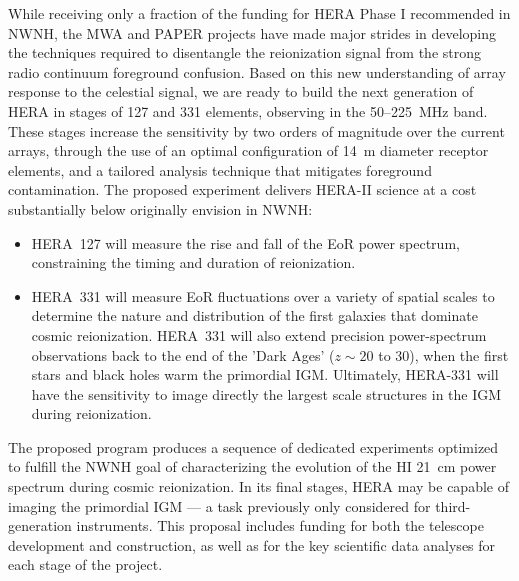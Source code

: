 \documentclass[preprint]{aastex}
\begin{document}
While receiving only a fraction of the funding for HERA Phase I
recommended in NWNH, the MWA and PAPER projects have made
major strides in developing the techniques required to disentangle
the reionization signal from the strong radio continuum foreground
confusion. Based on this new understanding of array response to the
celestial signal, we are ready to build the next generation of HERA in
stages of 127 and 331 elements, observing in the 50--225~MHz band.
These stages increase the sensitivity by two orders of
magnitude over the current arrays, through the use of an
optimal configuration of 14~m diameter receptor elements, and a
tailored analysis technique that mitigates foreground contamination.
The proposed experiment delivers HERA-II science at a cost
substantially below originally envision in NWNH:


\vspace{-4pt}
\begin{itemize}\setlength{\parskip}{0pt}\itemsep0pt

\item HERA~127 will measure the rise and fall of the EoR power
spectrum, constraining the timing and duration of reionization.

\item HERA~331 will measure EoR fluctuations over a variety of spatial
scales to determine the nature and distribution of the first galaxies
that dominate cosmic reionization. HERA~331 will also extend precision
power-spectrum observations back to the end of the 'Dark Ages' ($z \sim 20$
to 30), when the first stars and black holes warm the primordial IGM. Ultimately,
HERA-331 will have the sensitivity to
image directly the largest scale structures in the IGM during reionization.

\end{itemize}
\vspace{-4pt}

The proposed program produces a sequence of dedicated experiments
optimized to fulfill the NWNH goal of characterizing the evolution of
the HI 21~cm power spectrum during cosmic reionization. In
its final stages, HERA may be capable of imaging the primordial
IGM --- a task previously only considered for third-generation
instruments. This proposal includes funding for both the
telescope development and construction, as well as for the key
scientific data analyses for each stage of the project.
\end{document}
